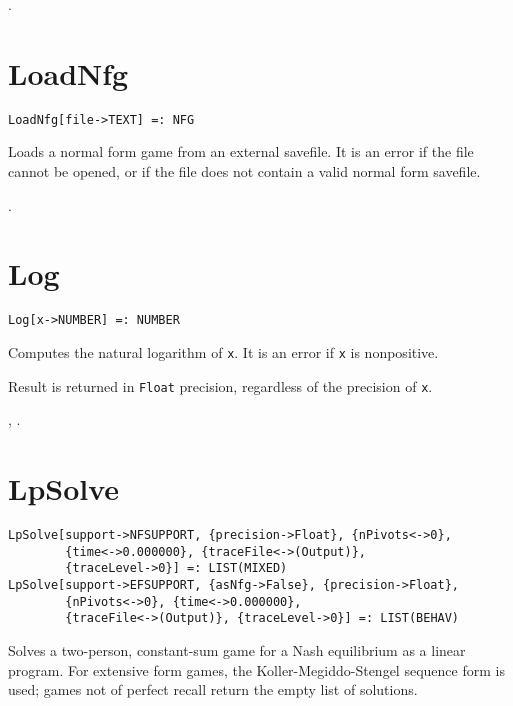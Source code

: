 \seealso {}.


\section*{LoadNfg}\label{PrimLoadNfg}
\begin{verbatim}
LoadNfg[file->TEXT] =: NFG 
\end{verbatim}

\noindent
Loads a normal form game from an external savefile.
It is an error if the file cannot be opened, or if the file does not 
contain a valid normal form savefile.

\seealso {}.


\section*{Log}\label{PrimLog}
\begin{verbatim}
Log[x->NUMBER] =: NUMBER 
\end{verbatim}

\noindent
Computes the natural logarithm of \verb+x+.  It is an error if
\verb+x+ is nonpositive.

\note Result is returned in \verb+Float+ precision, regardless of
the precision of \verb+x+.

\seealso {}, .


\section*{LpSolve}\label{PrimLpSolve}
\begin{verbatim}
LpSolve[support->NFSUPPORT, {precision->Float}, {nPivots<->0}, 
        {time<->0.000000}, {traceFile<->(Output)}, 
        {traceLevel->0}] =: LIST(MIXED) 
LpSolve[support->EFSUPPORT, {asNfg->False}, {precision->Float}, 
        {nPivots<->0}, {time<->0.000000}, 
        {traceFile<->(Output)}, {traceLevel->0}] =: LIST(BEHAV) 
\end{verbatim}

\noindent
Solves a two-person, constant-sum game for a Nash equilibrium as a linear
program.  For extensive form games, the Koller-Megiddo-Stengel
sequence form is used; games not of perfect recall return the empty
list of solutions.

